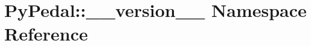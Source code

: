 \hypertarget{namespacePyPedal_1_1____version____}{
\section{PyPedal::\_\-\_\-version\_\-\_\- Namespace Reference}
\label{namespacePyPedal_1_1____version____}
}


